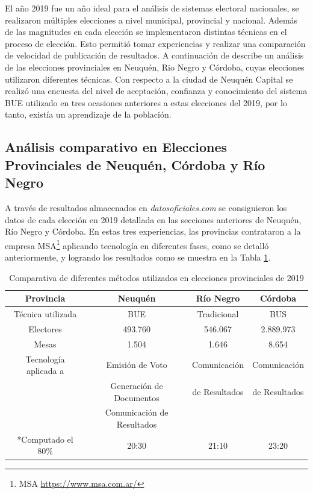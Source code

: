 El año 2019 fue un año ideal para el análisis de sistemas electoral nacionales, se realizaron múltiples elecciones a nivel municipal, provincial y nacional. Además de las magnitudes en cada elección se implementaron distintas técnicas en el proceso de elección. Esto permitió tomar experiencias y realizar una comparación de velocidad de publicación de resultados. A continuación de describe un análisis de las elecciones provinciales en Neuquén, Rio Negro y Córdoba, cuyas elecciones utilizaron diferentes técnicas. Con respecto a la ciudad de Neuquén Capital se realizó una encuesta del nivel de aceptación, confianza y conocimiento del sistema BUE utilizado en tres ocasiones anteriores a estas elecciones del 2019, por lo tanto, existía un aprendizaje de la población.

\subsection{Análisis comparativo en Elecciones Provinciales de Neuquén, Córdoba y Río Negro}
\label{analisisComparativoProvincial}

A través de resultados almacenados en \textit{datosoficiales.com} se consiguieron los datos de cada elección  en 2019 detallada en las secciones anteriores de Neuquén, Río Negro y Córdoba.   \newline
En estas tres experiencias, las provincias contrataron a la empresa MSA\footnote{MSA \url{https://www.msa.com.ar/}} aplicando tecnología en diferentes fases, como se detalló anteriormente, y logrando los resultados como se muestra en la Tabla \ref{tab:comparativa}.
\begin{table}[]
    \centering
    \begin{tabular}{|c|c|c|c|}
        \hline
         Provincia & Neuquén& Río Negro & Córdoba   \\
         \hline
         Técnica utilizada& BUE & Tradicional & BUS \\
         \hline
         Electores& 493.760 & 546.067 & 2.889.973 \\
         \hline
         Mesas& 1.504 & 1.646 & 8.654\\
         \hline
         Tecnología aplicada a& Emisión de Voto &Comunicación & Comunicación \\
         & Generación de Documentos & de Resultados &  de Resultados\\
         & Comunicación de Resultados & & \\
         \hline
         *Computado el 80\% & 20:30 & 21:10 & 23:20\\
         \hline
    \end{tabular}
    \caption{Comparativa de diferentes métodos utilizados en elecciones provinciales de 2019}
    \label{tab:comparativa}
\end{table}


